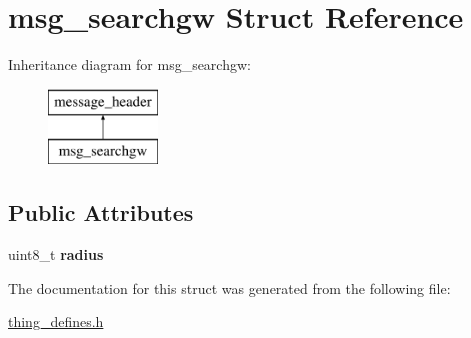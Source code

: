 \hypertarget{structmsg__searchgw}{\section{msg\-\_\-searchgw Struct Reference}
\label{structmsg__searchgw}
}
Inheritance diagram for msg\-\_\-searchgw\-:\begin{figure}[H]
\begin{center}
\leavevmode
\includegraphics[height=2.000000cm]{structmsg__searchgw}
\end{center}
\end{figure}
\subsection*{Public Attributes}
\begin{DoxyCompactItemize}
\item 
\hypertarget{structmsg__searchgw_aeb357d8594fb3d9f0e9f694a01776179}{uint8\-\_\-t {\bfseries radius}}\label{structmsg__searchgw_aeb357d8594fb3d9f0e9f694a01776179}

\end{DoxyCompactItemize}


The documentation for this struct was generated from the following file\-:\begin{DoxyCompactItemize}
\item 
\hyperlink{thing__defines_8h}{thing\-\_\-defines.\-h}\end{DoxyCompactItemize}

